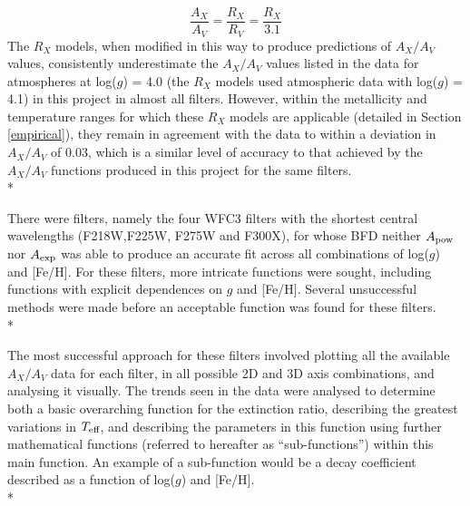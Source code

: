 \documentclass[12pt, a4paper]{report}
\begin{document}
\begin{equation}
\frac{A_{X}}{A_{V}} = \frac{R_{X}}{R_{V}} = \frac{R_{X}}{3.1}
\label{convert_Rx_to_Ax}
\end{equation}
The $R_{X}$ models, when modified in this way to produce predictions of $A_{X}/A_{V}$ values, consistently underestimate the $A_{X}/A_{V}$ values listed in the data for atmospheres at log($g$) = 4.0 (the $R_{X}$ models used atmospheric data with log($g$) = 4.1) in this project in almost all filters. However, within the metallicity and temperature ranges for which these $R_{X}$ models are applicable (detailed in Section \ref{empirical}), they remain in agreement with the data to within a deviation in $A_{X}/A_{V}$ of 0.03, which is a similar level of accuracy to that achieved by the $A_{X}/A_{V}$ functions produced in this project for the same filters.\\*

There were filters, namely the four WFC3 filters with the shortest central wavelengths (F218W,F225W, F275W and F300X), for whose BFD neither $A_{\textnormal{pow}}$ nor $A_{\textnormal{exp}}$ was able to produce an accurate fit across all combinations of log($g$) and [Fe/H]. For these filters, more intricate functions were sought, including functions with explicit dependences on $g$ and [Fe/H]. Several unsuccessful methods were made before an acceptable function was found for these filters.\\*

The most successful approach for these filters involved plotting all the available $A_{X}/A_{V}$ data for each filter, in all possible 2D and 3D axis combinations, and analysing it visually. The trends seen in the data were analysed to determine both a basic overarching function for the extinction ratio, describing the greatest variations in $T_{\textnormal{eff}}$, and describing the parameters in this function using further mathematical functions (referred to hereafter as ``sub-functions'') within this main function. An example of a sub-function would be a decay coefficient described as a function of log($g$) and [Fe/H].\\*
\end{document}
